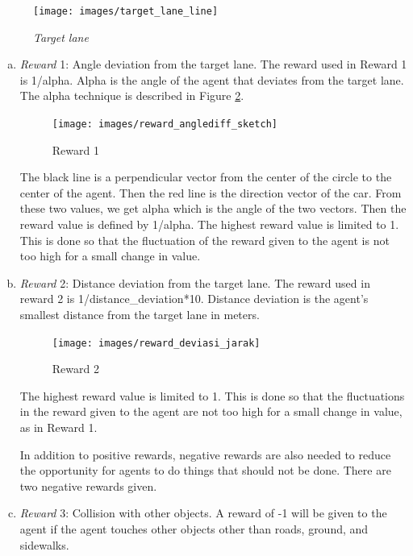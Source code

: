 \documentclass[conference]{IEEEtran}
\begin{document}
\begin{figure}[H] 
	\centering
	\texttt{[image: images/target\_lane\_line]}
	\caption{\textit{Target lane}}
	\label{fig:target_lane_line}
\end{figure}

\begin{enumerate}[a)]
\item \textit{Reward} 1: Angle deviation from the target lane.
The reward used in Reward 1 is 1/alpha. Alpha is the angle of the agent that deviates from the target lane. The alpha technique is described in Figure  \ref{fig:reward_anglediff_sketch}. 

\begin{figure}[H] 
	\centering
	\texttt{[image: images/reward\_anglediff\_sketch]}
	\caption{Reward 1}
	\label{fig:reward_anglediff_sketch}
\end{figure}

The black line is a perpendicular vector from the center of the circle to the center of the agent. Then the red line is the direction vector of the car. From these two values, we get alpha which is the angle of the two vectors. Then the reward value is defined by 1/alpha. The highest reward value is limited to 1. This is done so that the fluctuation of the reward given to the agent is not too high for a small change in value.

\item \textit{Reward} 2: Distance deviation from the target lane.
The reward used in reward 2 is 1/distance\_deviation*10. Distance deviation is the agent's smallest distance from the target lane in meters.

\begin{figure}[H] 
	\centering
	\texttt{[image: images/reward\_deviasi\_jarak]}
	\caption{Reward 2}
	\label{fig:reward_deviasi_jarak}
\end{figure}
The highest reward value is limited to 1. This is done so that the fluctuations in the reward given to the agent are not too high for a small change in value, as in Reward 1.


In addition to positive rewards, negative rewards are also needed to reduce the opportunity for agents to do things that should not be done. There are two negative rewards given.

\item \textit{Reward} 3: Collision with other objects.
A reward of -1 will be given to the agent if the agent touches other objects other than roads, ground, and sidewalks.


\end{enumerate}
\end{document}
